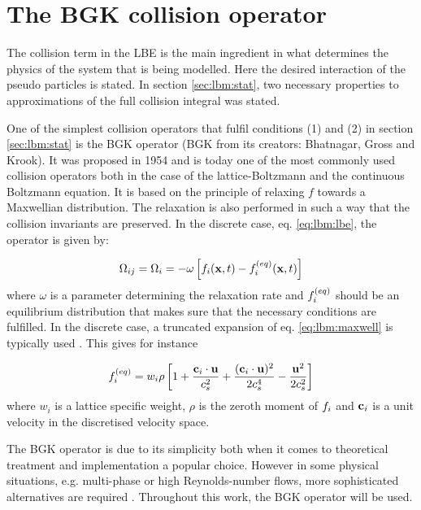 \section{The BGK collision operator}\label{sec:lbm:col}
The collision term in the LBE is the main ingredient in what
determines the physics of the system that is being modelled. Here the
desired interaction of the pseudo particles is stated. In section
\ref{sec:lbm:stat}, two necessary properties to approximations of the
full collision integral was stated.

One of the simplest collision operators that fulfil conditions (1)
and (2) in section \ref{sec:lbm:stat} is the BGK operator (BGK from
its creators: Bhatnagar, Gross and Krook). It was proposed in 1954 and
is today one of the most commonly used collision operators both in the
case of the lattice-Boltzmann and the continuous Boltzmann
equation. It is based on the principle of relaxing $f$ towards a
Maxwellian distribution. The relaxation is also performed in such a
way that the collision invariants are preserved.  In the discrete case,
eq. \eqref{eq:lbm:lbe}, the operator is given by:

\begin{equation}\label{eq:lbm:bgk}
\Omega_{ij} = \Omega_i = -\omega \left[ f_i(\mathbf{x}, t) - f_i^{(eq)}(\mathbf{x}, t)
  \right]
\end{equation}
where $\omega$ is a parameter determining the relaxation rate and
$f_i^{(eq)}$ should be an equilibrium distribution that makes sure that the
necessary conditions are fulfilled. In the discrete case, a truncated
expansion of eq. \eqref{eq:lbm:maxwell} is typically used
\cite{wolf-gladrow}. This gives for instance


\begin{equation}
f_i^{(eq)} = w_i\rho \left [ 1 + \frac{\mathbf{c}_i \cdot \mathbf{u}}{c_s^2} +
  \frac{(\mathbf{c}_i \cdot \mathbf{u})^2}{2c_s^4} - \frac{\mathbf{u}^2}{2c_s^2} \right]
\end{equation}
where $w_i$ is a lattice specific weight, $\rho$ is the zeroth moment
of $f_i$ and $\mathbf{c}_i$ is a unit velocity in the discretised velocity
space.

The BGK operator is due to its simplicity both when it comes to
theoretical treatment and implementation a popular choice. However in
some physical situations, e.g. multi-phase or high Reynolds-number
flows, more sophisticated alternatives are required
\cite{wolf-gladrow}. Throughout this work, the BGK operator will be
used.

